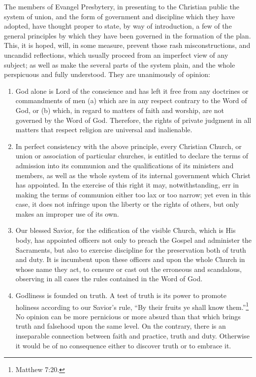 \documentclass[
]{book}
\begin{document}
The members of Evangel Presbytery, in presenting to the Christian public the system of union, and the form of government and discipline which they have adopted, have thought proper to state, by way of introduction, a few of the general principles by which they have been governed in the formation of the plan. This, it is hoped, will, in some measure, prevent those rash misconstructions, and uncandid reflections, which usually proceed from an imperfect view of any subject; as well as make the several parts of the system plain, and the whole perspicuous and fully understood. They are unanimously of opinion:

\begin{enumerate}
\def\labelenumi{\arabic{enumi}.}
\item
  God alone is Lord of the conscience and has left it free from any doctrines or commandments of men (a) which are in any respect contrary to the Word of God, or (b) which, in regard to matters of faith and worship, are not governed by the Word of God. Therefore, the rights of private judgment in all matters that respect religion are universal and inalienable.
\item
  In perfect consistency with the above principle, every Christian Church, or union or association of particular churches, is entitled to declare the terms of admission into its communion and the qualifications of its ministers and members, as well as the whole system of its internal government which Christ has appointed. In the exercise of this right it may, notwithstanding, err in making the terms of communion either too lax or too narrow; yet even in this case, it does not infringe upon the liberty or the rights of others, but only makes an improper use of its own.
\item
  Our blessed Savior, for the edification of the visible Church, which is His body, has appointed officers not only to preach the Gospel and administer the Sacraments, but also to exercise discipline for the preservation both of truth and duty. It is incumbent upon these officers and upon the whole Church in whose name they act, to censure or cast out the erroneous and scandalous, observing in all cases the rules contained in the Word of God.
\item
  Godliness is founded on truth. A test of truth is its power to promote holiness according to our Savior's rule, ``By their fruits ye shall know them.''\footnote{Matthew 7:20.} No opinion can be more pernicious or more absurd than that which brings truth and falsehood upon the same level. On the contrary, there is an inseparable connection between faith and practice, truth and duty. Otherwise it would be of no consequence either to discover truth or to embrace it.
\end{enumerate}
\end{document}
